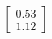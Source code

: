 \documentclass[preview]{standalone}
\begin{document}
\begin{align*}
\begin{bmatrix} 0.53 \\ 1.12 \end{bmatrix}
\end{align*}
\end{document}
